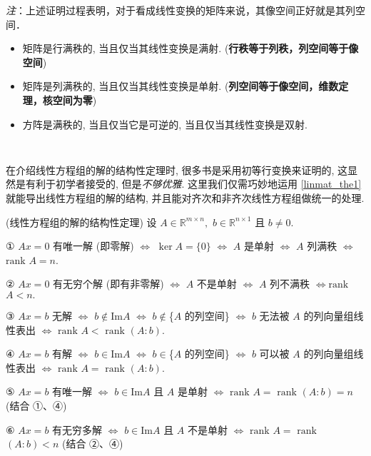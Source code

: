 \textsl{注}：上述证明过程表明，对于看成线性变换的矩阵来说，其像空间正好就是其列空间． 

\begin{itemize}
\item 矩阵是行满秩的, 当且仅当其线性变换是满射. (\textbf{行秩等于列秩，列空间等于像空间})
\end{itemize}

\begin{itemize}
\item 矩阵是列满秩的, 当且仅当其线性变换是单射. (\textbf{列空间等于像空间，维数定理，核空间为零})
\end{itemize}

\begin{itemize}
\item 方阵是满秩的, 当且仅当它是可逆的, 当且仅当其线性变换是双射. \end{itemize}
\verb| |

在介绍线性方程组的解的结构性定理时, 很多书是采用初等行变换来证明的, 这显然是有利于初学者接受的, 但是\textsl{不够优雅}. 这里我们仅需巧妙地运用 \autoref{linmat_the1} 就能导出线性方程组的解的结构,
并且能对齐次和非齐次线性方程组做统一的处理. 

\begin{theorem}{(线性方程组的解的结构性定理)}\label{linmat_the2}
设 $A\in\mathbb{R}^{m\times n},$ $b\in\mathbb{R}^{n\times1}$ 且 $b\neq0$.

① $Ax=0$ 有唯一解 (即零解) $\Leftrightarrow$ $\ker A=\{0\}$ $\Leftrightarrow$
$A$ 是单射 $\Leftrightarrow$ $A$ 列满秩 $\Leftrightarrow$ $\mathrm{rank}$
$A=n.$ 

② $Ax=0$ 有无穷个解 (即有非零解) $\Leftrightarrow$ $A$ 不是单射 $\Leftrightarrow$
$A$ 列不满秩 $\Leftrightarrow\mathrm{rank}$ $A<n.$ 

③ $Ax=b$ 无解 $\Leftrightarrow$ $b\notin\mathrm{Im}A$ $\Leftrightarrow$
$b\notin$\{$A$ 的列空间\} $\Leftrightarrow$ $b$ 无法被 $A$ 的列向量组线性表出
$\Leftrightarrow$ $\mathrm{rank}$ $A<$ $\mathrm{rank}$ $(A:b).$

④ $Ax=b$ 有解 $\Leftrightarrow$ $b\in\mathrm{Im}A$ $\Leftrightarrow$
$b\in$\{$A$ 的列空间\} $\Leftrightarrow$ $b$ 可以被 $A$ 的列向量组线性表出 $\Leftrightarrow$
$\mathrm{rank}$ $A=$ $\mathrm{rank}$ $(A:b).$

⑤ $Ax=b$ 有唯一解 $\Leftrightarrow$ $b\in\mathrm{Im}A$ 且 $A$ 是单射 $\Leftrightarrow$
$\mathrm{rank}$ $A=$ $\mathrm{rank}$ $(A:b)=n$ (结合 ①、④)

⑥ $Ax=b$ 有无穷多解 $\Leftrightarrow$ $b\in\mathrm{Im}A$ 且 $A$ 不是单射
$\Leftrightarrow$ $\mathrm{rank}$ $A=$ $\mathrm{rank}$ $(A:b)<n$
(结合 ②、④)
\end{theorem}

